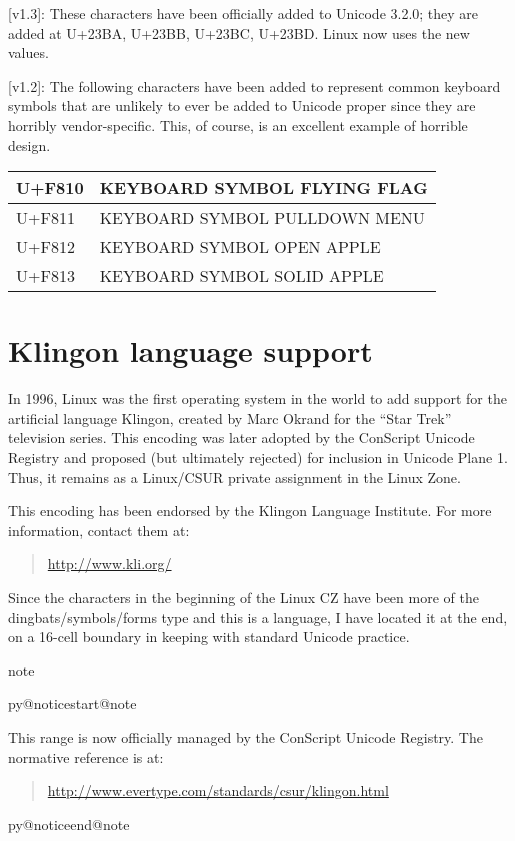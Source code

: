\documentclass[a4paper,8pt,english]{sphinxmanual}
\makeatletter
\renewenvironment{notice}[2]{%
          \def\py@noticetype{#1}
          \begin{coloredbox}{#1}
          \bf\it
          \par\strong{#2}
          \csname py@noticestart@#1\endcsname
        }
	{
          \csname py@noticeend@\py@noticetype\endcsname
          \end{coloredbox}
        }
\makeatother
\begin{document}
{[}v1.3{]}: These characters have been officially added to Unicode 3.2.0;
they are added at U+23BA, U+23BB, U+23BC, U+23BD.  Linux now uses the
new values.

{[}v1.2{]}: The following characters have been added to represent common
keyboard symbols that are unlikely to ever be added to Unicode proper
since they are horribly vendor-specific.  This, of course, is an
excellent example of horrible design.

\begin{tabulary}{\linewidth}{|L|L|}
\hline

U+F810
 & 
KEYBOARD SYMBOL FLYING FLAG
\\
\hline
U+F811
 & 
KEYBOARD SYMBOL PULLDOWN MENU
\\
\hline
U+F812
 & 
KEYBOARD SYMBOL OPEN APPLE
\\
\hline
U+F813
 & 
KEYBOARD SYMBOL SOLID APPLE
\\
\hline\end{tabulary}



\section{Klingon language support}
\label{admin-guide/unicode:klingon-language-support}
In 1996, Linux was the first operating system in the world to add
support for the artificial language Klingon, created by Marc Okrand
for the ``Star Trek'' television series.  This encoding was later
adopted by the ConScript Unicode Registry and proposed (but ultimately
rejected) for inclusion in Unicode Plane 1.  Thus, it remains as a
Linux/CSUR private assignment in the Linux Zone.

This encoding has been endorsed by the Klingon Language Institute.
For more information, contact them at:
\begin{quote}

\href{http://www.kli.org/}{http://www.kli.org/}
\end{quote}

Since the characters in the beginning of the Linux CZ have been more
of the dingbats/symbols/forms type and this is a language, I have
located it at the end, on a 16-cell boundary in keeping with standard
Unicode practice.

\begin{notice}{note}{Note:}
This range is now officially managed by the ConScript Unicode
Registry.  The normative reference is at:
\begin{quote}

\href{http://www.evertype.com/standards/csur/klingon.html}{http://www.evertype.com/standards/csur/klingon.html}
\end{quote}
\end{notice}
\end{document}
